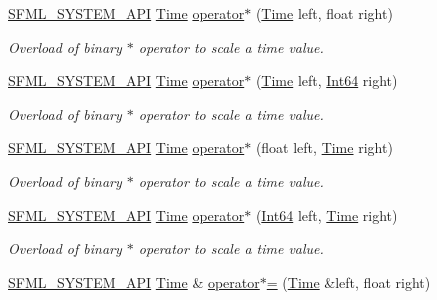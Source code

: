 \begin{DoxyCompactItemize}
\hyperlink{_system_2_export_8hpp_a6476c9e422606477a4c23d92b1d79a1f}{S\-F\-M\-L\-\_\-\-S\-Y\-S\-T\-E\-M\-\_\-\-A\-P\-I} \hyperlink{classsf_1_1_time}{Time} \hyperlink{classsf_1_1_time_ac1386c6360872d354b9b59eadcd9778d}{operator$\ast$} (\hyperlink{classsf_1_1_time}{Time} left, float right)
\begin{DoxyCompactList}\small\item\em Overload of binary $\ast$ operator to scale a time value. \end{DoxyCompactList}\item 
\hyperlink{_system_2_export_8hpp_a6476c9e422606477a4c23d92b1d79a1f}{S\-F\-M\-L\-\_\-\-S\-Y\-S\-T\-E\-M\-\_\-\-A\-P\-I} \hyperlink{classsf_1_1_time}{Time} \hyperlink{classsf_1_1_time_acd021b3ebb108053d7dec56869e27385}{operator$\ast$} (\hyperlink{classsf_1_1_time}{Time} left, \hyperlink{namespacesf_a2840579fed3494d9f330baf7a5a19903}{Int64} right)
\begin{DoxyCompactList}\small\item\em Overload of binary $\ast$ operator to scale a time value. \end{DoxyCompactList}\item 
\hyperlink{_system_2_export_8hpp_a6476c9e422606477a4c23d92b1d79a1f}{S\-F\-M\-L\-\_\-\-S\-Y\-S\-T\-E\-M\-\_\-\-A\-P\-I} \hyperlink{classsf_1_1_time}{Time} \hyperlink{classsf_1_1_time_a63723c9e9c5ff6151377ec4350c6f36e}{operator$\ast$} (float left, \hyperlink{classsf_1_1_time}{Time} right)
\begin{DoxyCompactList}\small\item\em Overload of binary $\ast$ operator to scale a time value. \end{DoxyCompactList}\item 
\hyperlink{_system_2_export_8hpp_a6476c9e422606477a4c23d92b1d79a1f}{S\-F\-M\-L\-\_\-\-S\-Y\-S\-T\-E\-M\-\_\-\-A\-P\-I} \hyperlink{classsf_1_1_time}{Time} \hyperlink{classsf_1_1_time_a40a6d0938fb4a43731d54fd90bfc6476}{operator$\ast$} (\hyperlink{namespacesf_a2840579fed3494d9f330baf7a5a19903}{Int64} left, \hyperlink{classsf_1_1_time}{Time} right)
\begin{DoxyCompactList}\small\item\em Overload of binary $\ast$ operator to scale a time value. \end{DoxyCompactList}\item 
\hyperlink{_system_2_export_8hpp_a6476c9e422606477a4c23d92b1d79a1f}{S\-F\-M\-L\-\_\-\-S\-Y\-S\-T\-E\-M\-\_\-\-A\-P\-I} \hyperlink{classsf_1_1_time}{Time} \& \hyperlink{classsf_1_1_time_a8996b6a6fcb8f3854b486b8e43949b50}{operator$\ast$=} (\hyperlink{classsf_1_1_time}{Time} \&left, float right)

\end{DoxyCompactItemize}

